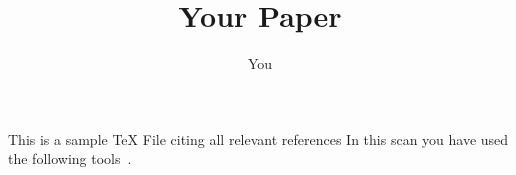 \documentclass{article}
\title{Your Paper}
\author{You}
\begin{document}
\maketitle

This is a sample TeX File citing all relevant references
In this scan you have used the following tools~\cite{GAMBIT:2017yxo,Kvellestad:2019vxm,Mahmoudi:2007vz,Mahmoudi:2008tp,Mahmoudi:2009zz,GAMBITModelsWorkgroup:2017ilg,GAMBITFlavourWorkgroup:2017dbx}.



\end{document}
